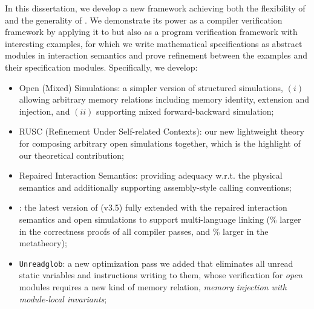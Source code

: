 %
In this dissertation, we develop a new framework achieving both the
flexibility of \ccx{} and the generality of \ccc{}.  We demonstrate
its power as a compiler verification framework by applying it to \cc{}
but also as a program verification framework with interesting
examples, for which we write mathematical specifications as abstract
modules in interaction semantics and prove refinement between the
examples and their specification modules.  Specifically, we develop:
\begin{itemize}
\item Open (Mixed) Simulations: a simpler version of structured simulations,
  $(i)$ allowing arbitrary memory relations including memory identity, extension and injection,
  and $(ii)$ supporting mixed forward-backward simulation;
\item RUSC (Refinement Under Self-related Contexts): our new
  lightweight theory for composing arbitrary open simulations
  together, which is the highlight of our theoretical contribution;
\item Repaired Interaction Semantics: providing adequacy w.r.t. the
  physical semantics and additionally supporting assembly-style
  calling conventions;
\item \ccm{}: the latest version of \cc{} (v3.5) fully extended with
  the repaired interaction semantics and open simulations to support
  multi-language linking (\% larger in the correctness
  proofs of all compiler passes, and \% larger in the metatheory);
\item \texttt{Unreadglob}:
  a new optimization pass we added that eliminates all unread static
  variables and instructions writing to them,
  whose verification for \emph{open} modules requires
  a new kind of memory relation, \emph{memory injection with module-local
  invariants};
\end{itemize}
\medskip

